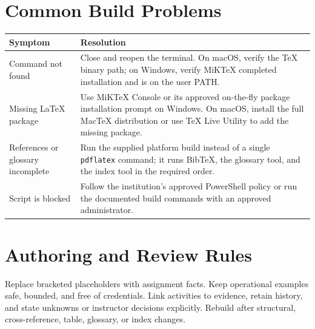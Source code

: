 \section{Common Build Problems}
\begin{tabularx}{\linewidth}{L{3.0cm}Y}
\toprule \textbf{Symptom} & \textbf{Resolution}\\ \midrule
Command not found & Close and reopen the terminal. On macOS, verify the TeX
binary path; on Windows, verify MiKTeX completed installation and is on the user PATH.\\
Missing LaTeX package & Use MiKTeX Console or its approved on-the-fly package
installation prompt on Windows. On macOS, install the full MacTeX distribution
or use TeX Live Utility to add the missing package.\\
References or glossary incomplete & Run the supplied platform build instead of
a single \texttt{pdflatex} command; it runs BibTeX, the glossary tool, and the
index tool in the required order.\\
Script is blocked & Follow the institution's approved PowerShell policy or run
the documented build commands with an approved administrator.\\ \bottomrule
\end{tabularx}

\section{Authoring and Review Rules}
Replace bracketed placeholders with assignment facts. Keep operational examples
safe, bounded, and free of credentials. Link activities to evidence, retain
history, and state unknowns or instructor decisions explicitly. Rebuild after
structural, cross-reference, table, glossary, or index changes.
